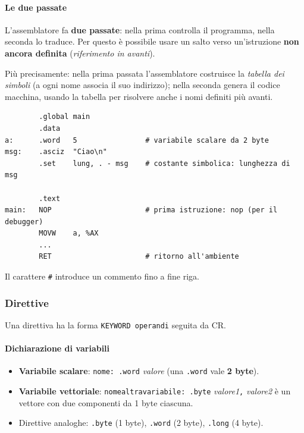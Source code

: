 \documentclass[11pt,a4paper]{article}
\begin{document}
\paragraph*{Le due passate}

L'assemblatore fa \textbf{due passate}: nella prima controlla il programma, nella seconda lo traduce. Per questo è possibile usare un salto verso un'istruzione \textbf{non ancora definita} (\emph{riferimento in avanti}).

\begin{integrazione}
Più precisamente: nella prima passata l'assemblatore costruisce la \emph{tabella dei simboli} (a ogni nome associa il suo indirizzo); nella seconda genera il codice macchina, usando la tabella per risolvere anche i nomi definiti più avanti.
\end{integrazione}

\begin{integrazione}
\begin{lstlisting}
        .global main
        .data
a:      .word   5                # variabile scalare da 2 byte
msg:    .asciz  "Ciao\n"
        .set    lung, . - msg    # costante simbolica: lunghezza di msg

        .text
main:   NOP                      # prima istruzione: nop (per il debugger)
        MOVW    a, %AX
        ...
        RET                      # ritorno all'ambiente
\end{lstlisting}
Il carattere \texttt{\#} introduce un commento fino a fine riga.
\end{integrazione}

\subsubsection*{Direttive}

Una direttiva ha la forma \texttt{KEYWORD operandi} seguita da CR.

\paragraph*{Dichiarazione di variabili}

\begin{itemize}[leftmargin=*]
  \item \textbf{Variabile scalare}: \texttt{nome: .word} \emph{valore} (una \texttt{.word} vale \textbf{2 byte}).
  \item \textbf{Variabile vettoriale}: \texttt{nomealtravariabile: .byte} \emph{valore1}\texttt{,} \emph{valore2} è un vettore con due componenti da 1 byte ciascuna.
  \item Direttive analoghe: \texttt{.byte} (1 byte), \texttt{.word} (2 byte), \texttt{.long} (4 byte).
\end{itemize}
\end{document}
